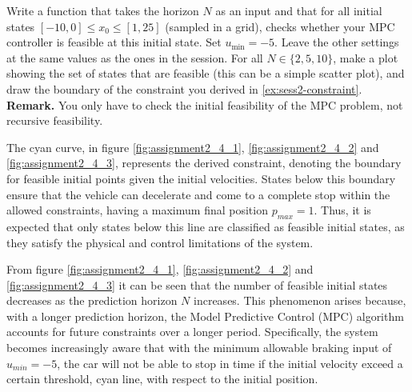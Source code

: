 \documentclass[]{article}
\begin{document}
\begin{assignment} \label{ex:extra-1}
	Write a function that takes the horizon $N$ as an input and that 
	for all initial states $[-10, 0] \leq x_0 \leq [1, 25]$ (sampled in a grid), checks whether your MPC controller is feasible at this initial state.
	Set $u_{\min} = -5$.
	Leave the other settings at the same values as the ones in the session.
	For all $N \in \{2, 5, 10\}$, make a plot showing the set of states that are feasible (this can be a simple scatter plot), 
	and draw the boundary of the constraint you derived in \cref{ex:sess2-constraint}. 
	\textbf{Remark.} You only have to check the initial feasibility of the MPC problem, not recursive feasibility.
\end{assignment}
\begin{flushleft}
	The cyan curve, in figure \ref{fig:assignment2_4_1}, \ref{fig:assignment2_4_2} and \ref{fig:assignment2_4_3}, represents the derived constraint, denoting the boundary for feasible initial points given the initial velocities. 
	States below this boundary ensure that the vehicle can decelerate and come to a complete stop within the allowed constraints, having a maximum final position $p_{max}=1$. 
	Thus, it is expected that only states below this line are classified as feasible initial states, as they satisfy the physical and control limitations of the system.
\end{flushleft}
From figure \ref{fig:assignment2_4_1}, \ref{fig:assignment2_4_2} and \ref{fig:assignment2_4_3} it can be seen that the number of feasible initial states decreases as the prediction horizon $N$ increases. 
This phenomenon arises because, with a longer prediction horizon, the Model Predictive Control (MPC) algorithm accounts for future constraints over a longer period. 
Specifically, the system becomes increasingly aware that with the minimum allowable braking input of $u_{min}=-5$, the car will not be able to stop in time if the initial velocity exceed a certain threshold, cyan line, with respect to the initial position.
\end{document}
